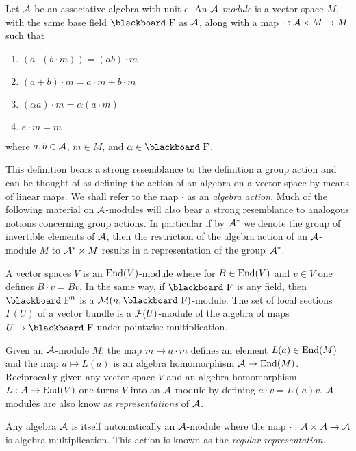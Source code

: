 \documentclass[12pt,titlepage]{article}
\def\bbf#1{\hbox{\blackboard #1}}
\def\lF{\bbf F}
\def\cA{{\cal A}}
\def\cF{{\cal F}}
\def\cM{{\cal M}}
\def\End{\hbox{End}}
\begin{document}
Let \(\cA\) be an associative algebra with unit
\(e\). An {\em \(\cA\)-module\/}
\index{module!\(\cA\)-}%
  is a vector space \(M\), with the same
base
field \(\lF\) as \(\cA\), along with a
map \(\cdot:\cA\times M \to M\)  such that
\begin{enumerate}%
\item \((a\cdot(b\cdot m))=(ab)\cdot m\)
\item \((a+b)\cdot m=a\cdot m + b\cdot m\)
\item \((\alpha a)\cdot m = \alpha(a\cdot m)\)
\item \(e\cdot m = m\)
\end{enumerate}
where \(a,b\in \cA\), \(m\in M\), and \(\alpha\in\lF\).

This definition bears a strong resemblance to the definition a group
action and  can be thought of as defining the action of an
algebra on a vector space by means of linear maps. We shall refer to
the map \(\cdot\) as an {\em algebra action\/}. 
%
Much of the following
material on \(\cA\)-modules will also bear a strong resemblance to
analogous
notions concerning group actions. In particular if by \(\cA^*\) we denote
the  group of
invertible elements of \(\cA\), then the restriction of the algebra action
of an \(\cA\)-module \(M\) to \(\cA^*\times M\) results in a
representation of the group \(\cA^*\).

A vector spaces \(V\) is an \(\End(V)\)-module where for \(B\in
\End(V)\) and \(v\in V\) one defines 
\(B\cdot v= Bv\). In the same way, if \(\lF\) is any field, then
\(\lF^n\) is a \(\cM(n,\lF)\)-module.
The set of local sections \(\Gamma(U)\) of a vector
bundle is a \(\cF(U)\)-module of the algebra of maps \(U\to \lF\) under
pointwise multiplication.

Given an \(\cA\)-module \(M\), the map \(m\mapsto a\cdot m\) defines an
element \(L(a)\in\End(M)\) and the map \(a\mapsto L(a)\) is an algebra
homomorphism \(\cA\to \End(M)\). Reciprocally given any vector space
\(V\) and an algebra homomorphism \linebreak \(L:\cA\to \End(V)\) 
one turns \(V\)
into an \(\cA\)-module by defining \(a\cdot v = L(a)v\). \(\cA\)-modules
are also know as {\em representations\/}
%
 of \(\cA\).

Any algebra \(\cA\) is itself automatically an \(\cA\)-module where the
map \linebreak \(\cdot:\cA\times\cA\to\cA\) is algebra multiplication. 
This action is
known as the {\em regular representation\/}. 
%
\end{document}
